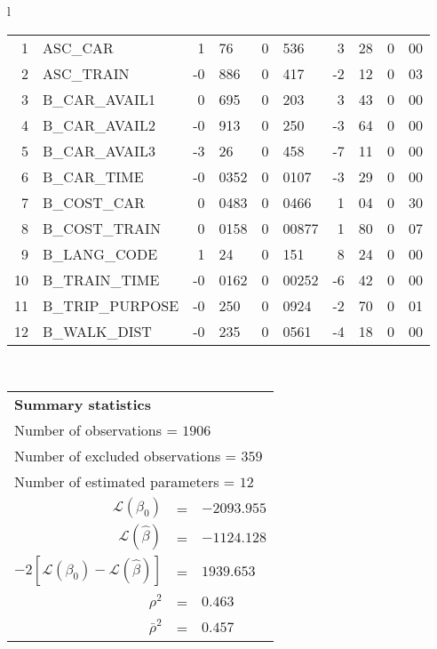 \begin{tabular}{l}
\begin{tabular}{rlr@{.}lr@{.}lr@{.}lr@{.}l}
1 & ASC_CAR & 1&76 & 0&536 & 3&28 & 0&00\\
2 & ASC_TRAIN & -0&886 & 0&417 & -2&12 & 0&03\\
3 & B_CAR_AVAIL1 & 0&695 & 0&203 & 3&43 & 0&00\\
4 & B_CAR_AVAIL2 & -0&913 & 0&250 & -3&64 & 0&00\\
5 & B_CAR_AVAIL3 & -3&26 & 0&458 & -7&11 & 0&00\\
6 & B_CAR_TIME & -0&0352 & 0&0107 & -3&29 & 0&00\\
7 & B_COST_CAR & 0&0483 & 0&0466 & 1&04 & 0&30\\
8 & B_COST_TRAIN & 0&0158 & 0&00877 & 1&80 & 0&07\\
9 & B_LANG_CODE & 1&24 & 0&151 & 8&24 & 0&00\\
10 & B_TRAIN_TIME & -0&0162 & 0&00252 & -6&42 & 0&00\\
11 & B_TRIP_PURPOSE & -0&250 & 0&0924 & -2&70 & 0&01\\
12 & B_WALK_DIST & -0&235 & 0&0561 & -4&18 & 0&00\\
\hline
\end{tabular}
\\
\begin{tabular}{rcl}
\multicolumn{3}{l}{\bf Summary statistics}\\
\multicolumn{3}{l}{ Number of observations = $1906$} \\
\multicolumn{3}{l}{ Number of excluded observations = $359$} \\
\multicolumn{3}{l}{ Number of estimated  parameters = $12$} \\
 $\mathcal{L}(\beta_0)$ &=&  $-2093.955$ \\
 $\mathcal{L}(\hat{\beta})$ &=& $-1124.128 $  \\
 $-2[\mathcal{L}(\beta_0) -\mathcal{L}(\hat{\beta})]$ &=& $1939.653$ \\
    $\rho^2$ &=&   $0.463$ \\
    $\bar{\rho}^2$ &=&    $0.457$ \\
\end{tabular}
  \end{tabular}
